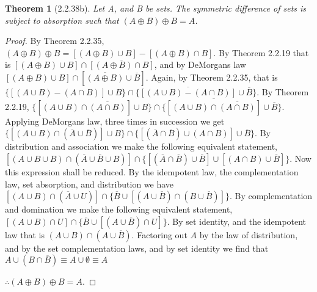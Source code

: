 \documentclass[a4paper, 12pt]{article}
\theoremstyle{plain}
\newtheorem*{theorem*}{Theorem}
\begin{document}
	
	\begin{theorem*}[2.2.38b]
		Let A, and B be sets. The symmetric difference of sets is subject to absorption such that 
		$(A \oplus B) \oplus B = A$.
	\end{theorem*}

	\begin{proof}
		By Theorem 2.2.35, $(A \oplus B) \oplus B = [(A \oplus B) \cup B] - [(A \oplus B) \cap B]$. 
		By Theorem 2.2.19 that is $[(A \oplus B) \cup B] \cap \overline{[(A \oplus B) \cap B]}$, 
		and by DeMorgans law $[(A \oplus B) \cup B] \cap [\overline{(A \oplus B)} \cup \overline{B}]$. 
		Again, by Theorem 2.2.35, that is \newline 
		$\{[(A \cup B) - (A \cap B)] \cup B\} \cap 
		\{\overline{[(A \cup B) - (A \cap B)]} \cup \overline{B}\}$. By Theorem 2.2.19, 
		$\{[(A \cup B) \cap \overline{(A \cap B)}] \cup B\} \cap 
		\{\overline{[(A \cup B) \cap \overline{(A \cap B)}]} \cup \overline{B}\}$. Applying 
		DeMorgans law, three times in succession we get \newline 
		$\{[(A \cup B) \cap (\overline{A} \cup \overline{B})] \cup B\} \cap 
		\{[(\overline{A} \cap \overline{B}) \cup (A \cap B)] \cup \overline{B}\}$. By distribution 
		and association we make the following equivalent statement, \newline 
		$[(A \cup B \cup B) \cap (\overline{A} \cup \overline{B} \cup B)] \cap 
		\{[(\overline{A} \cap \overline{B}) \cup \overline{B}] \cup [(A \cap B) \cup \overline{B}]\}$. 
		Now this expression shall be reduced. By the idempotent law, the complementation law, 
		set absorption, and distribution we have \newline 
		$[(A \cup B) \cap (\overline{A} \cup U)] \cap 
		\{\overline{B} \cup [(A \cup \overline{B}) \cap (B \cup \overline{B})]\}$. By complementation 
		and domination we make the following equivalent statement, \newline 
		$[(A \cup B) \cap U] \cap \{\overline{B} \cup [(A \cup \overline{B}) \cap U]\}$. By set 
		identity, and the idempotent law that is $(A \cup B) \cap (A \cup \overline{B})$. Factoring 
		out $A$ by the law of distribution, and by the set complementation laws, and by set identity 
		we find that \newline $A \cup (B \cap \overline{B}) \equiv A \cup \emptyset \equiv A$
		
		$\therefore (A \oplus B) \oplus B = A$.
	\end{proof}
\end{document}

